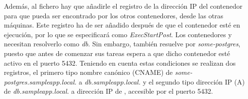 Además, al fichero  hay que añadirle el registro de la dirección IP del contenedor  para que pueda ser encontrado por los otros contenedores, desde las otras máquinas. Este registro ha de ser añadido después de que el contenedor esté en ejecución, por lo que se especificará como \textit{ExecStartPost}. Los contenedores  y  necesitan resolverlo como \textit{db}. Sin embargo,  también resuelve por \textit{some-postgres}, puesto que antes de comenzar sus tareas espera a que dicho contenedor esté activo en el puerto 5432. Teniendo en cuenta estas condiciones se realizan dos registros, el primero tipo nombre canónico (CNAME) de \textit{some-postgres.sampleapp.local.} a \textit{db.sampleapp.local.} y el segundo tipo dirección IP (A) de \textit{db.sampleapp.local.} a dirección IP de , accesible por el puerto 5432.

